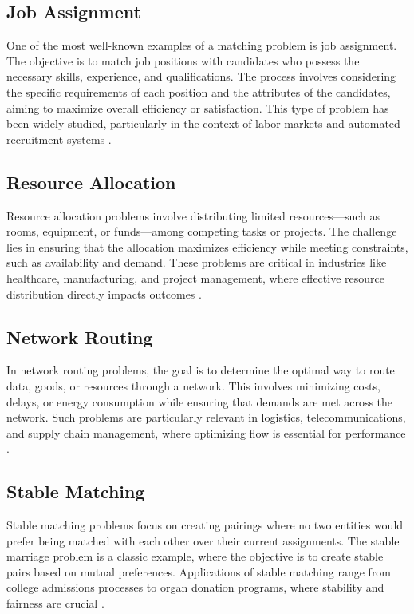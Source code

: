     \subsection{Job Assignment} \label{subsec:job_assignment}
        One of the most well-known examples of a matching problem is job assignment. The objective is to match job positions with candidates who possess the necessary skills, experience, and qualifications. The process involves considering the specific requirements of each position and the attributes of the candidates, aiming to maximize overall efficiency or satisfaction. This type of problem has been widely studied, particularly in the context of labor markets and automated recruitment systems \cite{roth1990two}.

    \subsection{Resource Allocation} \label{subsec:resource_allocation}
        Resource allocation problems involve distributing limited resources—such as rooms, equipment, or funds—among competing tasks or projects. The challenge lies in ensuring that the allocation maximizes efficiency while meeting constraints, such as availability and demand. These problems are critical in industries like healthcare, manufacturing, and project management, where effective resource distribution directly impacts outcomes \cite{schrijver2003combinatorial}.
    
    \subsection{Network Routing} \label{subsec:network_routing}
        In network routing problems, the goal is to determine the optimal way to route data, goods, or resources through a network. This involves minimizing costs, delays, or energy consumption while ensuring that demands are met across the network. Such problems are particularly relevant in logistics, telecommunications, and supply chain management, where optimizing flow is essential for performance \cite{ahuja1993network}.
    
    \subsection{Stable Matching} \label{subsec:stable_matching}
        Stable matching problems focus on creating pairings where no two entities would prefer being matched with each other over their current assignments. The stable marriage problem is a classic example, where the objective is to create stable pairs based on mutual preferences. Applications of stable matching range from college admissions processes to organ donation programs, where stability and fairness are crucial \cite{gusfield1989stable, demange1986multi}.
    
